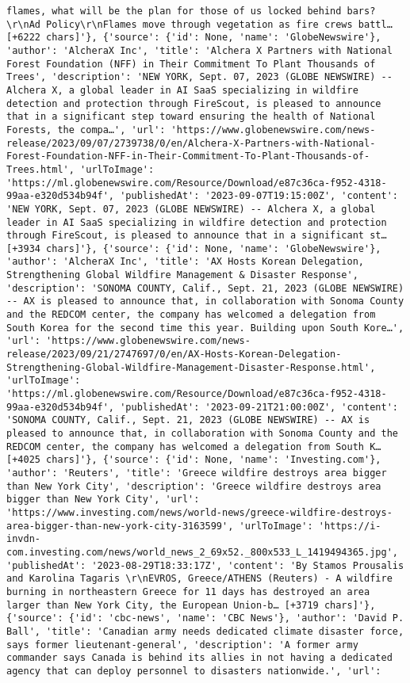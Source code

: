 \documentclass[
  letterpaper,
  DIV=11,
  numbers=noendperiod]{scrartcl}
\begin{document}
\begin{verbatim}
flames, what will be the plan for those of us locked behind bars?\r\nAd Policy\r\nFlames move through vegetation as fire crews battl… [+6222 chars]'}, {'source': {'id': None, 'name': 'GlobeNewswire'}, 'author': 'AlcheraX Inc', 'title': 'Alchera X Partners with National Forest Foundation (NFF) in Their Commitment To Plant Thousands of Trees', 'description': 'NEW YORK, Sept. 07, 2023 (GLOBE NEWSWIRE) -- Alchera X, a global leader in AI SaaS specializing in wildfire detection and protection through FireScout, is pleased to announce that in a significant step toward ensuring the health of National Forests, the compa…', 'url': 'https://www.globenewswire.com/news-release/2023/09/07/2739738/0/en/Alchera-X-Partners-with-National-Forest-Foundation-NFF-in-Their-Commitment-To-Plant-Thousands-of-Trees.html', 'urlToImage': 'https://ml.globenewswire.com/Resource/Download/e87c36ca-f952-4318-99aa-e320d534b94f', 'publishedAt': '2023-09-07T19:15:00Z', 'content': 'NEW YORK, Sept. 07, 2023 (GLOBE NEWSWIRE) -- Alchera X, a global leader in AI SaaS specializing in wildfire detection and protection through FireScout, is pleased to announce that in a significant st… [+3934 chars]'}, {'source': {'id': None, 'name': 'GlobeNewswire'}, 'author': 'AlcheraX Inc', 'title': 'AX Hosts Korean Delegation, Strengthening Global Wildfire Management & Disaster Response', 'description': 'SONOMA COUNTY, Calif., Sept. 21, 2023 (GLOBE NEWSWIRE) -- AX is pleased to announce that, in collaboration with Sonoma County and the REDCOM center, the company has welcomed a delegation from South Korea for the second time this year. Building upon South Kore…', 'url': 'https://www.globenewswire.com/news-release/2023/09/21/2747697/0/en/AX-Hosts-Korean-Delegation-Strengthening-Global-Wildfire-Management-Disaster-Response.html', 'urlToImage': 'https://ml.globenewswire.com/Resource/Download/e87c36ca-f952-4318-99aa-e320d534b94f', 'publishedAt': '2023-09-21T21:00:00Z', 'content': 'SONOMA COUNTY, Calif., Sept. 21, 2023 (GLOBE NEWSWIRE) -- AX is pleased to announce that, in collaboration with Sonoma County and the REDCOM center, the company has welcomed a delegation from South K… [+4025 chars]'}, {'source': {'id': None, 'name': 'Investing.com'}, 'author': 'Reuters', 'title': 'Greece wildfire destroys area bigger than New York City', 'description': 'Greece wildfire destroys area bigger than New York City', 'url': 'https://www.investing.com/news/world-news/greece-wildfire-destroys-area-bigger-than-new-york-city-3163599', 'urlToImage': 'https://i-invdn-com.investing.com/news/world_news_2_69x52._800x533_L_1419494365.jpg', 'publishedAt': '2023-08-29T18:33:17Z', 'content': 'By Stamos Prousalis and Karolina Tagaris \r\nEVROS, Greece/ATHENS (Reuters) - A wildfire burning in northeastern Greece for 11 days has destroyed an area larger than New York City, the European Union-b… [+3719 chars]'}, {'source': {'id': 'cbc-news', 'name': 'CBC News'}, 'author': 'David P. Ball', 'title': 'Canadian army needs dedicated climate disaster force, says former lieutenant-general', 'description': 'A former army commander says Canada is behind its allies in not having a dedicated agency that can deploy personnel to disasters nationwide.', 'url': 
\end{verbatim}
\end{document}
